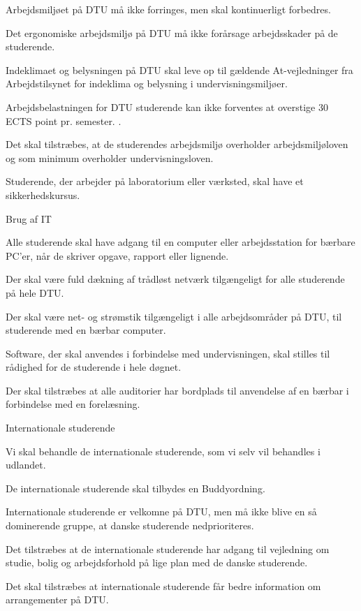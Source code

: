 \begin{list}{•}
\item Arbejdsmiljøet på DTU må ikke forringes, men skal kontinuerligt forbedres.
\item Det ergonomiske arbejdsmiljø på DTU må ikke forårsage arbejdsskader på de studerende.
\item Indeklimaet og belysningen på DTU skal leve op til gældende At-vejledninger fra Arbejdstilsynet for
indeklima og belysning i undervisningsmiljøer.
\item Arbejdsbelastningen for DTU studerende kan ikke forventes at overstige 30 ECTS point pr. semester. .
\item Det skal tilstræbes, at de studerendes arbejdsmiljø overholder arbejdsmiljøloven og som minimum overholder
undervisningsloven.
\item Studerende, der arbejder på laboratorium eller værksted, skal have et sikkerhedskursus.
\end{list}
Brug af IT
\begin{list}{•}
\item Alle studerende skal have adgang til en computer eller arbejdsstation for bærbare PC’er, når de skriver opgave,
rapport eller lignende.
\item Der skal være fuld dækning af trådløst netværk tilgængeligt for alle studerende på hele DTU.
\item Der skal være net- og strømstik tilgængeligt i alle arbejdsområder på DTU, til studerende med en bærbar
computer.
\item Software, der skal anvendes i forbindelse med undervisningen, skal stilles til rådighed for de studerende i hele
døgnet.
\item Der skal tilstræbes at alle auditorier har bordplads til anvendelse af en bærbar i forbindelse med en
forelæsning.
\end{list}
Internationale studerende

\begin{list}{•}
\item Vi skal behandle de internationale studerende, som vi selv vil behandles i udlandet.
\item De internationale studerende skal tilbydes en Buddyordning.
\item Internationale studerende er velkomne på DTU, men må ikke blive en så dominerende gruppe, at danske
studerende nedprioriteres.
\item Det tilstræbes at de internationale studerende har adgang til vejledning om studie, bolig og arbejdsforhold på
lige plan med de danske studerende.
\item Det skal tilstræbes at internationale studerende får bedre information om arrangementer på DTU.
\end{list}



